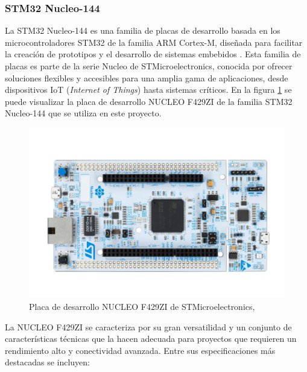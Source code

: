 

\subsubsection{STM32 Nucleo-144}


La STM32 Nucleo-144 es una familia de placas de desarrollo basada en los microcontroladores STM32 de la familia ARM Cortex-M, diseñada para facilitar la creación de prototipos y el desarrollo de sistemas embebidos \cite{nucleo144}. Esta familia de placas es parte de la serie Nucleo de STMicroelectronics, conocida por ofrecer soluciones flexibles y accesibles para una amplia gama de aplicaciones, desde dispositivos IoT (\textit{Internet of Things}) hasta sistemas críticos. En la figura \ref{fig:nucleo144} se puede visualizar la placa de desarrollo NUCLEO F429ZI de la familia STM32 Nucleo-144 que se utiliza en este proyecto.\\


\begin{figure}[H]
    \centering
    \includegraphics[height=\linewidth, angle=90]{img/nucleo144.jpeg}
    \caption{Placa de desarrollo NUCLEO F429ZI de STMicroelectronics,}
    \label{fig:nucleo144}
\end{figure}



La NUCLEO F429ZI se caracteriza por su gran versatilidad y un conjunto de características técnicas que la hacen adecuada para proyectos que requieren un rendimiento alto y conectividad avanzada. Entre sus especificaciones más destacadas se incluyen:

